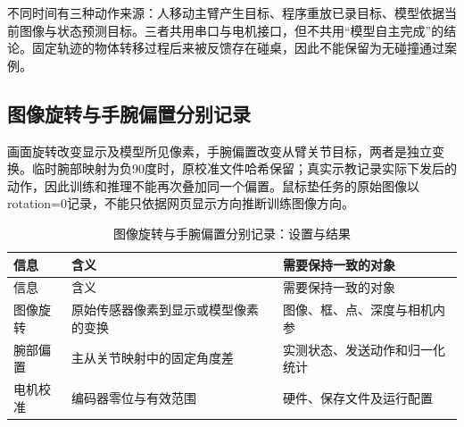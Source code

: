 不同时间有三种动作来源：人移动主臂产生目标、程序重放已录目标、模型依据当前图像与状态预测目标。三者共用串口与电机接口，但不共用``模型自主完成''的结论。固定轨迹的物体转移过程后来被反馈存在碰桌，因此不能保留为无碰撞通过案例。

\subsection{图像旋转与手腕偏置分别记录}\label{s01-detail-3}

画面旋转改变显示及模型所见像素，手腕偏置改变从臂关节目标，两者是独立变换。临时腕部映射为负90度时，原校准文件哈希保留；真实示教记录实际下发后的动作，因此训练和推理不能再次叠加同一个偏置。鼠标垫任务的原始图像以rotation=0记录，不能只依据网页显示方向推断训练图像方向。

\FloatBarrier\begingroup\small\setlength{\tabcolsep}{2.5pt}
\begin{longtable}[]{@{}
  >{\raggedright\arraybackslash}p{}
  >{\raggedright\arraybackslash}p{}
  >{\raggedright\arraybackslash}p{}@{}}
\caption{图像旋转与手腕偏置分别记录：设置与结果}\label{tab:s01-2}\tabularnewline
\toprule\noalign{}
\begin{minipage}[b]{\linewidth}\raggedright
信息
\end{minipage} & \begin{minipage}[b]{\linewidth}\raggedright
含义
\end{minipage} & \begin{minipage}[b]{\linewidth}\raggedright
需要保持一致的对象
\end{minipage} \\
\midrule\noalign{}
\endfirsthead
\toprule\noalign{}
\begin{minipage}[b]{\linewidth}\raggedright
信息
\end{minipage} & \begin{minipage}[b]{\linewidth}\raggedright
含义
\end{minipage} & \begin{minipage}[b]{\linewidth}\raggedright
需要保持一致的对象
\end{minipage} \\
\midrule\noalign{}
\endhead
\bottomrule\noalign{}
\endlastfoot
图像旋转 & 原始传感器像素到显示或模型像素的变换 & 图像、框、点、深度与相机内参 \\
腕部偏置 & 主从关节映射中的固定角度差 & 实测状态、发送动作和归一化统计 \\
电机校准 & 编码器零位与有效范围 & 硬件、保存文件及运行配置 \\
\end{longtable}\endgroup

